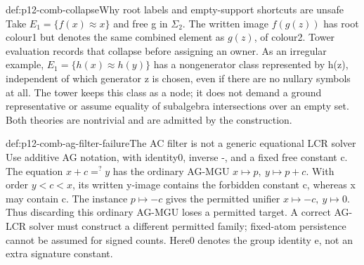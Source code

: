 \begin{hbexample}{def:p12-comb-collapse}{Why root labels and empty-support shortcuts are unsafe}
Take \(E_1=\{f(x)\approx x\}\) and free g in \(\Sigma_2\).
The written image \(f(g(z))\) has root colour1 but denotes the same
combined element as \(g(z)\), of colour2. Tower evaluation records that
collapse before assigning an owner. As an irregular example,
\(E_1=\{h(x)\approx h(y)\}\) has a nongenerator class represented
by h(z), independent of which generator z is chosen, even if there
are no nullary symbols at all. The tower keeps this class as a node;
it does not demand a ground representative or assume equality of
subalgebra intersections over an empty set. Both theories are
nontrivial and are admitted by the construction.
\end{hbexample}

\begin{hbexample}{def:p12-comb-ag-filter-failure}{The AC filter is not a generic equational LCR solver}
Use additive AG notation, with identity0, inverse -, and a fixed free
constant c. The equation \(x+c=^{?}y\) has the ordinary AG-MGU
\(x\mapsto p,\ y\mapsto p+c\). With order \(y<c<x\), its written
y-image contains the forbidden constant c, whereas x may contain c.
The instance \(p\mapsto -c\) gives the permitted unifier
\(x\mapsto -c,\ y\mapsto0\). Thus discarding this ordinary AG-MGU loses a permitted
target. A correct AG-LCR solver must construct a different permitted
family; fixed-atom persistence cannot be assumed for signed counts.
Here0 denotes the group identity e, not an extra signature constant.
\end{hbexample}


